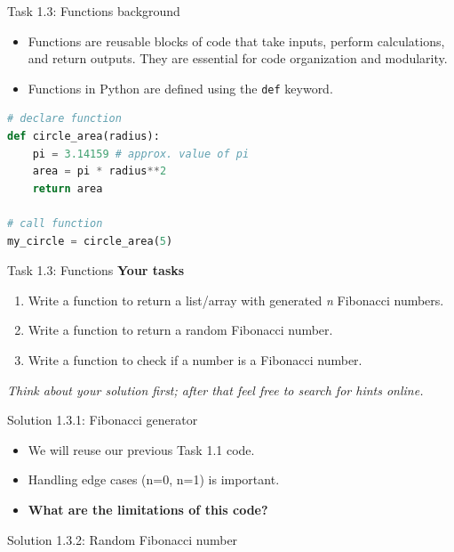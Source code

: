 \begin{frame}[fragile]{Task 1.3: Functions background }
\begin{itemize}
    \item Functions are reusable blocks of code that take inputs, perform calculations, and return outputs. They are essential for code organization and modularity. 
    \item Functions in Python are defined using the \texttt{def} keyword.
\end{itemize}
    
\begin{lstlisting}[language=Python]
# declare function
def circle_area(radius):
    pi = 3.14159 # approx. value of pi
    area = pi * radius**2 
    return area

# call function
my_circle = circle_area(5)
\end{lstlisting}
\end{frame}

\begin{frame}{Task 1.3: Functions}
\textbf{Your tasks}
\begin{enumerate}
    \item Write a function to return a list/array with generated \textit{n} Fibonacci numbers.
    \item Write a function to return a random Fibonacci number.
    \item Write a function to check if a number is a Fibonacci number.
\end{enumerate}
\vspace{1em}
\textit{Think about your solution first; after that feel free to search for hints online.}   
\end{frame}

\begin{frame}[fragile]{Solution 1.3.1: Fibonacci generator}
\small
\begin{itemize}
    \item We will reuse our previous Task 1.1 code.
    \item Handling edge cases (n=0, n=1) is important.
    \item \textbf{What are the limitations of this code?}
\end{itemize}

\vfill


\end{frame}

\begin{frame}[fragile]{Solution 1.3.2: Random Fibonacci number}
\footnotesize

\end{frame}

